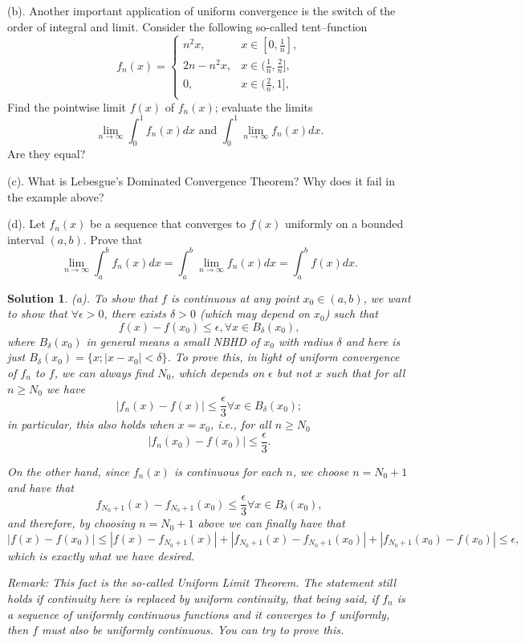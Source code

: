 \documentclass[6pt]{article}
\newtheorem{solution}{Solution}
\numberwithin{equation}{section}
\begin{document}
\begin{enumerate}
(b).  Another important application of uniform convergence is the switch of the order of integral and limit.  Consider the following so-called tent--function
\begin{equation}f_n(x)=
\left\{
\begin{array}{ll}
n^2x,& x\in[0,\frac{1}{n}],\\
2n-n^2x,& x\in(\frac{1}{n},\frac{2}{n}],\\
0,& x\in(\frac{2}{n},1],\\
\end{array}
\right.
\end{equation}
Find the pointwise limit $f(x)$ of $f_n(x)$;  evaluate the limits \[\lim_{n\rightarrow \infty} \int_0^1 f_n(x)dx \text{ and }\int_0^1 \lim_{n\rightarrow \infty} f_n(x)dx.\]  Are they equal?

(c).  What is Lebesgue's Dominated Convergence Theorem? Why does it fail in the example above?

(d).  Let $f_n(x)$ be a sequence that converges to $f(x)$ uniformly on a bounded interval $(a,b)$.  Prove that
\[\lim_{n\rightarrow \infty} \int_a^b f_n(x)dx=\int_a^b \lim_{n\rightarrow \infty} f_n(x)dx=\int_a^b f (x)dx.\]
\begin{solution}
(a).  To show that $f$ is continuous at any point $x_0\in(a,b)$, we want to show that $\forall \epsilon>0$, there exists $\delta>0$ (which may depend on $x_0$) such that
\[f(x)-f(x_0)\leq \epsilon, \forall x\in B_\delta(x_0),\]
where $B_\delta(x_0)$ in general means a small NBHD of $x_0$ with radius $\delta$ and here is just $B_\delta(x_0)=\{x;|x-x_0|<\delta\}$.  To prove this, in light of uniform convergence of $f_n$ to $f$, we can always find $N_0$, which depends on $\epsilon$ but not $x$ such that for all $n\geq N_0$ we have
\[|f_n(x)-f(x)|\leq \frac{\epsilon}{3} \forall  x\in B_\delta(x_0);\]
in particular, this also holds when $x=x_0$, i.e., for all $n\geq N_0$
\[|f_n(x_0)-f(x_0)|\leq \frac{\epsilon}{3}.\]

On the other hand, since $f_n(x)$ is continuous for each $n$, we choose $n=N_0+1$ and have that
\[f_{N_0+1}(x)-f_{N_0+1}(x_0)\leq \frac{\epsilon}{3} \forall  x\in B_\delta(x_0),\]
and therefore, by choosing $n=N_0+1$ above we can finally have that
\[|f(x)-f(x_0)|\leq |f(x)-f_{N_0+1}(x)|+|f_{N_0+1}(x)-f_{N_0+1}(x_0)|+|f_{N_0+1}(x_0)-f(x_0)|\leq \epsilon,\]
which is exactly what we have desired.

Remark:  This fact is the so-called Uniform Limit Theorem.  The statement still holds if continuity here is replaced by uniform continuity, that being said, if $f_n$ is a sequence of uniformly continuous functions and it converges to $f$ uniformly, then $f$ must also be uniformly continuous.  You can try to prove this.


\end{solution}
\end{enumerate}
\end{document}
